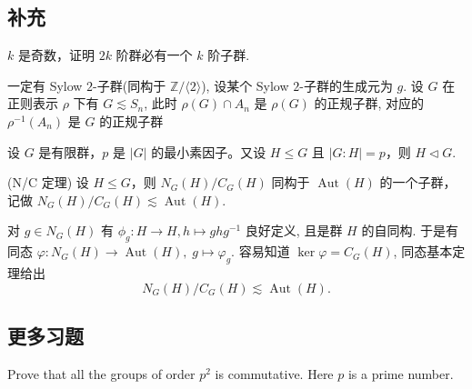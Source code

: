 
\subsection{补充}

\setcounter{pb}{1}
\begin{problem}
    $k$ 是奇数，证明 $2k$ 阶群必有一个 $k$ 阶子群.
\end{problem}

\begin{vain}
    一定有 Sylow $2$-子群(同构于 $\mathbb{Z}/\langle 2 \rangle$), 设某个 Sylow $2$-子群的生成元为 $g$. 
    设 $G$ 在正则表示 $\rho$ 下有 $G \lesssim S_{n}$, 
    此时 $\rho(G)\cap A_{n}$ 是 $\rho(G)$ 的正规子群, 
    对应的 $\rho^{-1}(A_{n})$ 是 $G$ 的正规子群
\end{vain}

\setcounter{pb}{3}
\begin{problem}
    设 $G $ 是有限群，$p $ 是 $|G| $ 的最小素因子。又设 $H \leq G $ 且 $|G:H| = p $，则 $H \vartriangleleft G $. 
\end{problem}

\setcounter{pb}{4}
\begin{problem}
    (N/C 定理) 设 $H \leq G$，则 $N_G(H) / C_G(H)$ 同构于 $\operatorname{Aut}(H)$ 的一个子群，记做 $N_G(H) / C_G(H) \lesssim \operatorname{Aut}(H)$.
\end{problem}

\begin{solution}
    对 $g\in N_G(H)$ 有 $\phi_{g}\colon H\to H, h\mapsto g h g^{-1}$ 良好定义, 且是群 $H$ 的自同构. 于是有同态 $\varphi  \colon N_{G}(H)\to \operatorname{Aut}(H),\; g\mapsto \varphi_g$. 
    容易知道 $\ker\varphi=C_{G}(H)$, 同态基本定理给出
        \[
            N_G(H) / C_G(H) \lesssim \operatorname{Aut}(H).
        \]
\end{solution}

\subsection{更多习题}

\setcounter{pb}{5}

\begin{problem}
    Prove that all the groups of order $p^{2}$ is commutative. Here $p$ is a prime number.
\end{problem}

